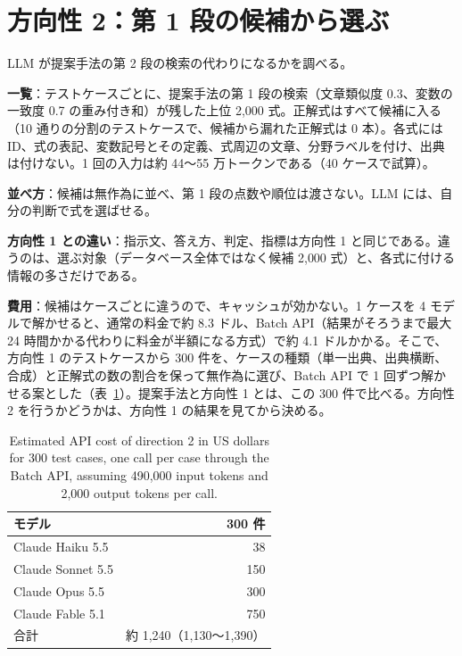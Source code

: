 \documentclass[11pt,a4paper]{ltjsarticle}
\begin{document}
\section{方向性 2：第 1 段の候補から選ぶ}
LLM が提案手法の第 2 段の検索の代わりになるかを調べる。

\textbf{一覧}：テストケースごとに、提案手法の第 1 段の検索（文章類似度 0.3、変数の一致度 0.7 の重み付き和）が残した上位 2{,}000 式。正解式はすべて候補に入る（10 通りの分割のテストケースで、候補から漏れた正解式は 0 本）。各式には ID、式の表記、変数記号とその定義、式周辺の文章、分野ラベルを付け、出典は付けない。1 回の入力は約 44〜55 万トークンである（40 ケースで試算）。

\textbf{並べ方}：候補は無作為に並べ、第 1 段の点数や順位は渡さない。LLM には、自分の判断で式を選ばせる。

\textbf{方向性 1 との違い}：指示文、答え方、判定、指標は方向性 1 と同じである。違うのは、選ぶ対象（データベース全体ではなく候補 2{,}000 式）と、各式に付ける情報の多さだけである。

\textbf{費用}：候補はケースごとに違うので、キャッシュが効かない。1 ケースを 4 モデルで解かせると、通常の料金で約 8.3 ドル、Batch API（結果がそろうまで最大 24 時間かかる代わりに料金が半額になる方式）で約 4.1 ドルかかる。そこで、方向性 1 のテストケースから 300 件を、ケースの種類（単一出典、出典横断、合成）と正解式の数の割合を保って無作為に選び、Batch API で 1 回ずつ解かせる案とした（表~\ref{tab:cost2}）。提案手法と方向性 1 とは、この 300 件で比べる。方向性 2 を行うかどうかは、方向性 1 の結果を見てから決める。

\begin{table}[h]\centering
\caption{Estimated API cost of direction 2 in US dollars for 300 test cases, one call per case through the Batch API, assuming 490,000 input tokens and 2,000 output tokens per call.}
\label{tab:cost2}
\begin{tabular}{@{}lr@{}}
\toprule
モデル & 300 件 \\
\midrule
Claude Haiku 5.5  & 38  \\
Claude Sonnet 5.5 & 150 \\
Claude Opus 5.5   & 300 \\
Claude Fable 5.1  & 750 \\
\midrule
合計 & 約 1{,}240（1{,}130〜1{,}390） \\
\bottomrule
\end{tabular}
\end{table}
\end{document}

